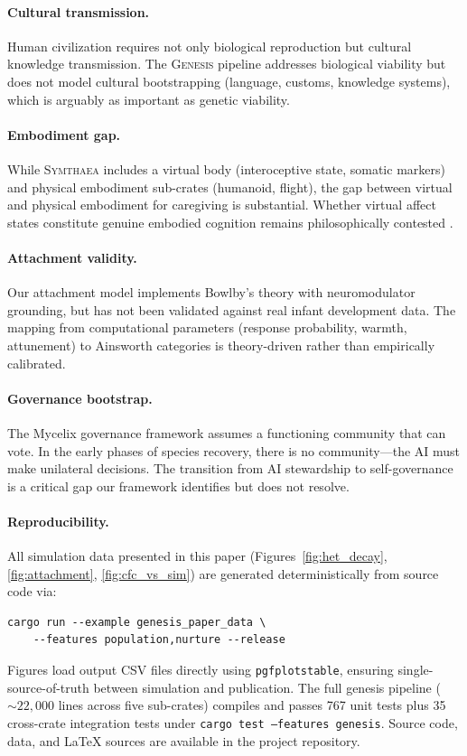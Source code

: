 \documentclass[11pt,letterpaper]{article}
\newcommand{\symthaea}{\textsc{Symthaea}}
\newcommand{\genesis}{\textsc{Genesis}}
\begin{document}
\paragraph{Cultural transmission.} Human civilization requires not only
biological reproduction but cultural knowledge transmission. The \genesis{}
pipeline addresses biological viability but does not model cultural
bootstrapping (language, customs, knowledge systems), which is arguably as
important as genetic viability.

\paragraph{Embodiment gap.} While \symthaea{} includes a virtual body
(interoceptive state, somatic markers) and physical embodiment sub-crates
(humanoid, flight), the gap between virtual and physical embodiment for
caregiving is substantial. Whether virtual affect states constitute genuine
embodied cognition remains philosophically contested
\cite{varela1991embodied,thompson2007mind}.

\paragraph{Attachment validity.} Our attachment model implements Bowlby's theory
\cite{bowlby1969attachment} with neuromodulator grounding, but has not been
validated against real infant development data. The mapping from computational
parameters (response probability, warmth, attunement) to Ainsworth categories
\cite{ainsworth1978patterns} is theory-driven rather than empirically calibrated.

\paragraph{Governance bootstrap.} The Mycelix governance framework assumes a
functioning community that can vote. In the early phases of species recovery,
there is no community---the AI must make unilateral decisions. The transition
from AI stewardship to self-governance is a critical gap our framework identifies
but does not resolve.

\paragraph{Reproducibility.} All simulation data presented in this paper
(Figures~\ref{fig:het_decay}, \ref{fig:attachment}, \ref{fig:cfc_vs_sim})
are generated deterministically from source code via:
\begin{verbatim}
cargo run --example genesis_paper_data \
    --features population,nurture --release
\end{verbatim}
Figures load output CSV files directly using \texttt{pgfplotstable}, ensuring
single-source-of-truth between simulation and publication. The full genesis
pipeline (${\sim}22{,}000$ lines across five sub-crates) compiles and passes
767 unit tests plus 35 cross-crate integration tests under
\texttt{cargo test --features genesis}. Source code, data, and \LaTeX{} sources
are available in the project repository.
\end{document}
